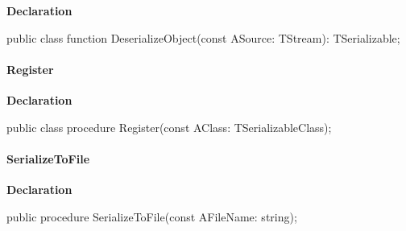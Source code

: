 \documentclass{report}
\newif\ifpdf
\begin{document}
\label{PasDoc_Serialize.TSerializable-DeserializeObject}
\begin{list}{}{
\setlength{\itemindent}{0cm}
\setlength{\listparindent}{0cm}
\setlength{\leftmargin}{\evensidemargin}
\addtolength{\leftmargin}{\tmplength}
\settowidth{\labelsep}{X}
\addtolength{\leftmargin}{\labelsep}
\setlength{\labelwidth}{\tmplength}
}
\item[\textbf{Declaration}\hfill]
\ifpdf
\begin{flushleft}
\fi
\begin{ttfamily}
public class function DeserializeObject(const ASource: TStream): TSerializable;\end{ttfamily}

\ifpdf
\end{flushleft}
\fi

\end{list}
\paragraph*{Register}\hspace*{\fill}

\label{PasDoc_Serialize.TSerializable-Register}
\begin{list}{}{
\setlength{\itemindent}{0cm}
\setlength{\listparindent}{0cm}
\setlength{\leftmargin}{\evensidemargin}
\addtolength{\leftmargin}{\tmplength}
\settowidth{\labelsep}{X}
\addtolength{\leftmargin}{\labelsep}
\setlength{\labelwidth}{\tmplength}
}
\item[\textbf{Declaration}\hfill]
\ifpdf
\begin{flushleft}
\fi
\begin{ttfamily}
public class procedure Register(const AClass: TSerializableClass);\end{ttfamily}

\ifpdf
\end{flushleft}
\fi

\end{list}
\paragraph*{SerializeToFile}\hspace*{\fill}

\label{PasDoc_Serialize.TSerializable-SerializeToFile}
\begin{list}{}{
\setlength{\itemindent}{0cm}
\setlength{\listparindent}{0cm}
\setlength{\leftmargin}{\evensidemargin}
\addtolength{\leftmargin}{\tmplength}
\settowidth{\labelsep}{X}
\addtolength{\leftmargin}{\labelsep}
\setlength{\labelwidth}{\tmplength}
}
\item[\textbf{Declaration}\hfill]
\ifpdf
\begin{flushleft}
\fi
\begin{ttfamily}
public procedure SerializeToFile(const AFileName: string);\end{ttfamily}

\ifpdf
\end{flushleft}
\fi

\end{list}
\end{document}
